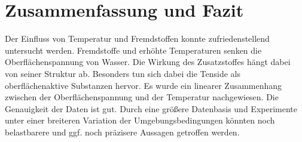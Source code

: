 \section{Zusammenfassung und Fazit}
\label{sec:zusammenfassung}

Der Einfluss von Temperatur und Fremdstoffen konnte zufriedenstellend untersucht werden. Fremdstoffe und erhöhte Temperaturen senken die Oberflächenspannung von Wasser. Die Wirkung des Zusatzstoffes hängt dabei von seiner Struktur ab. Besonders tun sich dabei die Tenside als oberflächenaktive Substanzen hervor.  Es wurde ein linearer Zusammenhang zwischen der Oberflächenspannung und der Temperatur nachgewiesen. Die Genauigkeit der Daten ist gut. Durch eine größere Datenbasis und Experimente unter einer breiteren Variation der Umgebungsbedingungen könnten noch belastbarere und ggf. noch präzisere Aussagen getroffen werden.